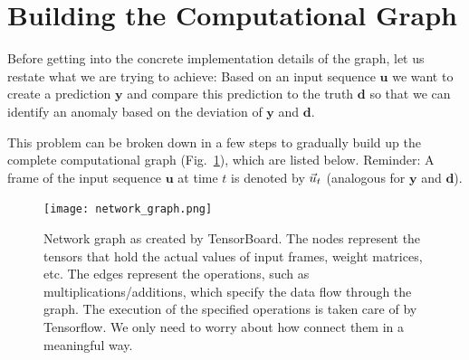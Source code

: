 \section{Building the Computational Graph}%
\label{sec:building_the_computational_graph}

Before getting into the concrete implementation details of the graph, let us
restate what we are trying to achieve:  Based on an input sequence $\mathbf{u}$
we want to create a prediction $\mathbf{y}$ and compare this prediction to the
truth $\mathbf{d}$ so that we can identify an anomaly based on the deviation of
$\mathbf{y}$ and $\mathbf{d}$. 

This problem can be broken down in a few steps to gradually build up the
complete computational graph (Fig.~\ref{fig:network_graph}), which are listed
below.  Reminder: A frame of the input sequence $\mathbf{u}$ at time $t$ is
denoted by $\vec{u}_t$ (analogous for $\mathbf{y}$ and $\mathbf{d}$).

\begin{figure}
  \centering
  \texttt{[image: network\_graph.png]}
  \caption{Network graph as created by TensorBoard. The nodes represent the
  tensors that hold the actual values of input frames, weight matrices, etc.
  The edges represent the operations, such as multiplications/additions, which
  specify the data flow through the graph. The execution of the specified
  operations is taken care of by Tensorflow. We only need to worry about how
  connect them in a meaningful way.}
  \label{fig:network_graph}
\end{figure}


